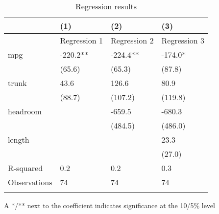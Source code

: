 \documentclass{article}
\begin{document}
\begin{table}[tbp] \centering
{}

\caption{Regression results}
\begin{tabularx}{\linewidth}{lCCC}

\toprule
&{(1)}&{(2)}&{(3)} \tabularnewline \midrule
{}&{Regression 1}&{Regression 2}&{Regression 3} \tabularnewline
\midrule \addlinespace[2ex]
mpg&-220.2**&-224.4**&-174.0* \tabularnewline
&(65.6)&(65.3)&(87.8) \tabularnewline
trunk&43.6&126.6&80.9 \tabularnewline
&(88.7)&(107.2)&(119.8) \tabularnewline
headroom&&-659.5&-680.3 \tabularnewline
&&(484.5)&(486.0) \tabularnewline
length&&&23.3 \tabularnewline
&&&(27.0) \tabularnewline
\midrule R-squared&0.2&0.2&0.3 \tabularnewline
Observations&74&74&74 \tabularnewline
\bottomrule \addlinespace[\belowrulesep]

\end{tabularx}
\begin{flushleft}
\footnotesize A */** next to the coefficient indicates significance at the 10/5\% level
\end{flushleft}
\end{table}
\end{document}
